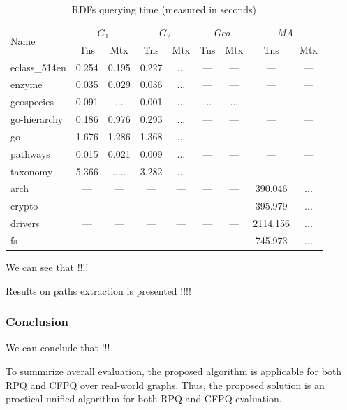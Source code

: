 {\setlength{\tabcolsep}{0.2em}
  \begin{table}
    \caption{RDFs querying time (measured in seconds)}
    \label{tbl:CFPQ_index}
    \small
    \begin{tabular}{| l | c | c | c | c | c | c | c | c |}
      \hline
      
      \multirow{2}{*}{Name}  & \multicolumn{2}{c|}{$G_1$} & \multicolumn{2}{c|}{$G_2$} & \multicolumn{2}{c|}{\textit{Geo}} & \multicolumn{2}{c|}{\textit{MA}}\\
      \cline{2-9}
                      & Tns     & Mtx     & Tns   & Mtx & Tns   & Mtx & Tns   & Mtx \\
      \hline
      \hline
      eclass\_514en   & 0.254   & 0.195   & 0.227 & ... & ---   & --- & ---      & ---\\
      enzyme          & 0.035   & 0.029   & 0.036 & ... & ---   & --- & ---      & ---\\
      geospecies      & 0.091   & ...     & 0.001 & ... & ...   & ... & ---      & ---\\
      go-hierarchy    & 0.186   & 0.976   & 0.293 & ... & ---   & --- & ---      & ---\\
      go              & 1.676   & 1.286   & 1.368 & ... & ---   & --- & ---      & ---\\
      pathways        & 0.015   & 0.021   & 0.009 & ... & ---   & --- & ---      & ---\\
      taxonomy        & 5.366   & .....   & 3.282 & ... & ---   & --- & ---      & ---\\
      \hline
      arch            & ---     & ---     & ---   & --- & ---   & --- & 390.046  & ...\\
      crypto          & ---     & ---     & ---   & --- & ---   & --- & 395.979  & ...\\
      drivers         & ---     & ---     & ---   & --- & ---   & --- & 2114.156 & ...\\
      fs              & ---     & ---     & ---   & --- & ---   & --- & 745.973  & ...\\
      \hline
    \end{tabular}
  \end{table}
}

We can see that !!!!

Results on paths extraction is presented !!!!

\subsubsection{Conclusion}

We can conclude that !!!

To summirize averall evaluation, the proposed algorithm is applicable for both RPQ and CFPQ over real-world graphs. 
Thus, the proposed solution is an proctical unified algorithm for both RPQ and CFPQ evaluation.
